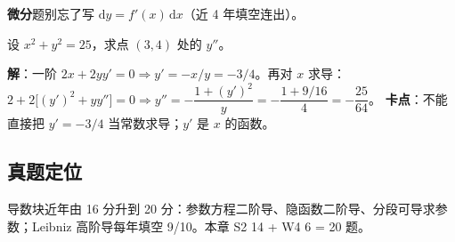 \documentclass[11pt,a4paper]{ctexart}
\newcommand{\D}{\mathrm{d}}
\begin{document}
\noindent\textbf{微分}题别忘了写 $\D y=f'(x)\,\D x$（近 4 年填空连出）。

\begin{keypoint}
设 $x^{2}+y^{2}=25$，求点 $(3,4)$ 处的 $y''$。

\noindent\textbf{解}：一阶 $2x+2yy'=0\Rightarrow y'=-x/y=-3/4$。再对 $x$ 求导：
$2+2\big[(y')^{2}+yy''\big]=0\Rightarrow y''=-\dfrac{1+(y')^{2}}{y}
=-\dfrac{1+9/16}{4}=\boxed{-\dfrac{25}{64}}$。
\textbf{卡点}：不能直接把 $y'=-3/4$ 当常数求导；$y'$ 是 $x$ 的函数。
\end{keypoint}

\subsection{真题定位}
导数块近年由 16 分升到 20 分：参数方程二阶导、隐函数二阶导、分段可导求参数；Leibniz 高阶导每年填空 9/10。本章 S2 14 + W4 6 = 20 题。
\end{document}
